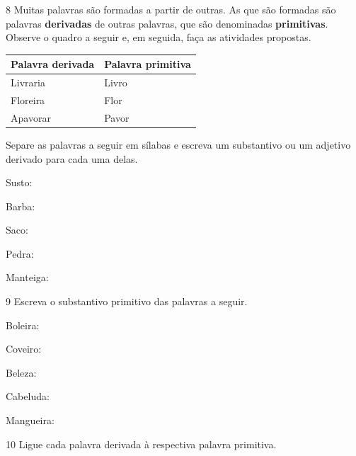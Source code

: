 \num{8} Muitas palavras são formadas a partir de outras. As que são formadas são
palavras \textbf{derivadas} de outras palavras, que são denominadas
\textbf{primitivas}. Observe o quadro a seguir e, em seguida, faça as
atividades propostas.

\begin{center}
\begin{tabular}{ll}
\hline
\textbf{Palavra derivada} & \textbf{Palavra primitiva} \\ \hline
Livraria & Livro \\
Floreira & Flor \\
Apavorar & Pavor \\ \hline
\end{tabular}
\end{center}

Separe as palavras a seguir em sílabas e escreva um substantivo ou um
adjetivo derivado para cada uma delas.

\begin{escolha}[itemsep=-5pt]
\item Susto: 
\item
  Barba: 
\item
  Saco: 
\item
  Pedra: 
\item
  Manteiga: 
\end{escolha}

\num{9} Escreva o substantivo primitivo das palavras a seguir.

\begin{escolha}[itemsep=-5pt]
\item Boleira: 

\item Coveiro: 

\item Beleza: 

\item Cabeluda: 

\item Mangueira: 
\end{escolha}

\num{10} Ligue cada palavra derivada à respectiva palavra primitiva.

